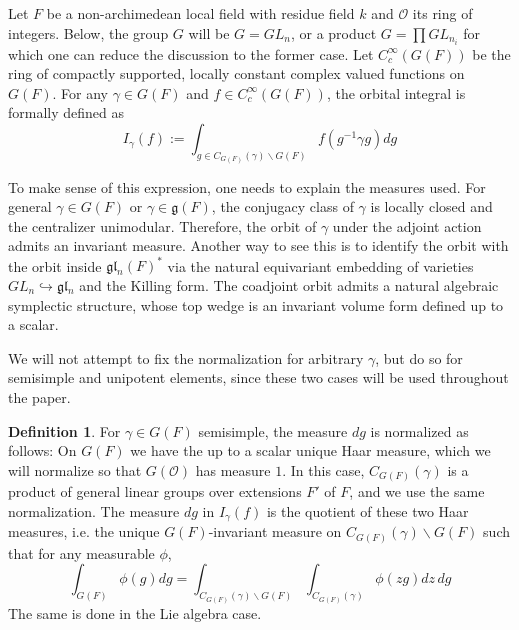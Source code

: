\documentclass{amsart}
\numberwithin{equation}{section}
\theoremstyle{definition}
\newtheorem{definition}[lemma]{Definition}%
\newcommand{\cO}{\mathcal{O}}
\newcommand{\fl}{\mathfrak{l}}
\newcommand{\fg}{\mathfrak{g}}
\newcommand{\bI}{\mathbf{I}}
\begin{document}
Let $F$ be a non-archimedean local field with residue field $k$ and $\cO$ its ring of integers. Below, the group $G$ will be $G=GL_n$, or a product $G=\prod GL_{n_i}$ for which one can reduce the discussion to the former case. %
Let $C_c^\infty(G(F))$ be the ring of compactly supported, locally constant complex valued functions on $G(F)$.
For any $\gamma\in G(F)$ and $f\in C_c^{\infty}(G(F))$, the orbital integral is formally defined as
\begin{equation}
I_\gamma(f):=\int_{g\in C_{G(F)}(\gamma)\backslash G(F)}f(g^{-1}\gamma g)dg
\end{equation}

To make sense of this expression, one needs to explain the measures used.
For general $\gamma\in G(F)$ or $\gamma\in\fg(F)$, the conjugacy class of $\gamma$ is locally closed and the centralizer unimodular. Therefore, the orbit of $\gamma$ under the adjoint action admits an invariant measure. Another way to see this is to identify the orbit with the orbit inside $\fg\fl_n(F)^*$ via the natural equivariant embedding of varieties $GL_n\hookrightarrow \fg\fl_n$ and the Killing form. The coadjoint orbit admits a natural algebraic symplectic structure, whose top wedge is an invariant volume form defined up to a scalar.

We will not attempt to fix the normalization for arbitrary $\gamma$, but do so for semisimple and unipotent elements, since these two cases will be used throughout the paper.
\begin{definition}
\label{def:haarmeasures}
For $\gamma\in G(F)$ semisimple, the measure $dg$ is normalized as follows: On $G(F)$ we have the up to a scalar unique Haar measure, which we will normalize so that $G(\cO)$ has measure $1$. In this case, $C_{G(F)}(\gamma)$ is a product of general linear groups over extensions $F'$ of $F$, and we use the same normalization. The measure $dg$ in $I_\gamma(f)$ is the quotient of these two Haar measures, i.e. the unique $G(F)$-invariant measure on $C_{G(F)}(\gamma)\backslash G(F)$ such that for any measurable $\phi$, $$\int_{G(F)}\phi(g)dg=\int_{C_{G(F)}(\gamma)\backslash G(F)}\int_{C_{G(F)}(\gamma)}\phi(zg)dz\,dg$$ The same is done in the Lie algebra case.
\end{definition}
\end{document}
